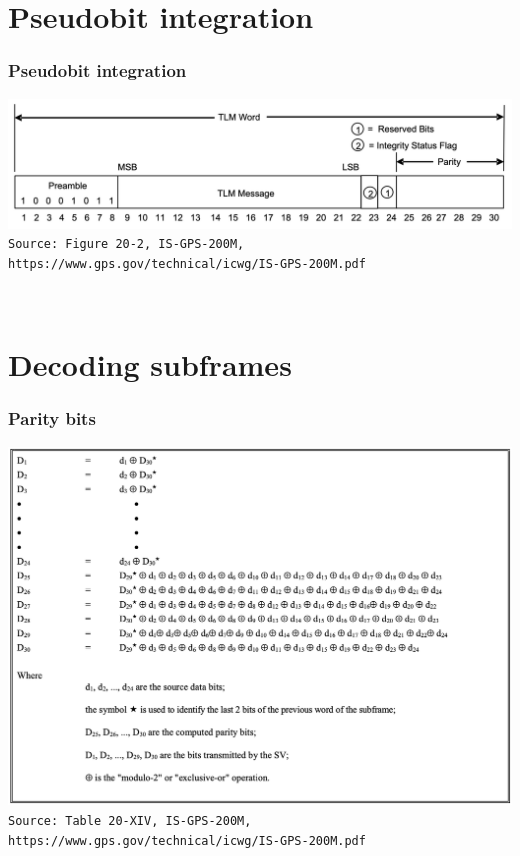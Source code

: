 \documentclass[aspectratio=169, xcolor=table]{beamer}
\begin{document}
\section{Pseudobit integration}

\begin{frame}
    \frametitle{Pseudobit integration}

    \centering
    \includegraphics[width=\textwidth]{8 tlm word.png} \\
    \texttt{\tiny{Source: Figure 20-2, IS-GPS-200M, https://www.gps.gov/technical/icwg/IS-GPS-200M.pdf}}

    \vspace{0.5cm}

    \Large
     \\
\end{frame}

\section{Decoding subframes}

\begin{frame}
    \frametitle{Parity bits}

    \centering
    \includegraphics[width=\textwidth * 6 / 10]{9 parity equations.png} \\
    \texttt{\tiny{Source: Table 20-XIV, IS-GPS-200M, https://www.gps.gov/technical/icwg/IS-GPS-200M.pdf}}
\end{frame}
\end{document}
